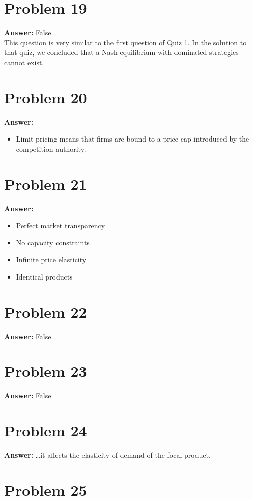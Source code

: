 \documentclass[11pt]{article}
\begin{document}
\section*{Problem 19}
\label{sec:org3fae9a1}

\textbf{Answer:} False\\

This question is very similar to the first question of Quiz 1. In the
solution to that quiz, we concluded that a Nash equilibrium with dominated
strategies cannot exist.
\section*{Problem 20}
\label{sec:org21abd82}

\textbf{Answer:}
\begin{itemize}
\item Limit pricing means that firms are bound to a price cap introduced by the
competition authority.
\end{itemize}
\section*{Problem 21}
\label{sec:org9fd7da9}

\textbf{Answer:}
\begin{itemize}
\item Perfect market transparency
\item No capacity constraints
\item Infinite price elasticity
\item Identical products
\end{itemize}
\section*{Problem 22}
\label{sec:org2d060c2}

\textbf{Answer:} False
\section*{Problem 23}
\label{sec:orgebca2b8}

\textbf{Answer:} False
\section*{Problem 24}
\label{sec:org71efbc8}

\textbf{Answer:} \ldots{}it affects the elasticity of demand of the focal product.
\section*{Problem 25}
\label{sec:orga8119b1}
\end{document}

